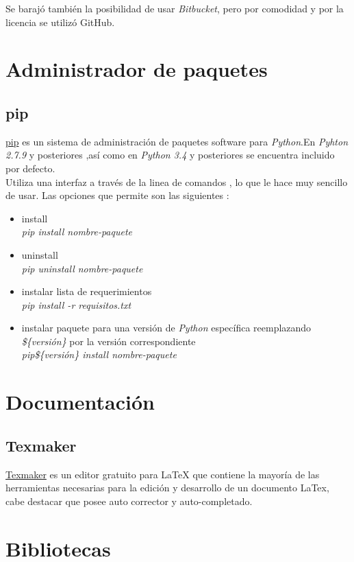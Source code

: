 Se barajó también la posibilidad de usar \emph{Bitbucket}, pero por comodidad y por la licencia se utilizó GitHub.
\section{Administrador de paquetes}
\subsection{pip} \label{pip}
\href{https://pypi.org/project/pip/}{pip} es un sistema de administración de paquetes software para \emph{Python}.En \emph{Pyhton 2.7.9} y posteriores ,así como en \emph{Python 3.4} y posteriores se encuentra incluido por defecto.\cite{pip}\\
Utiliza una interfaz a través de la linea de comandos , lo que le hace muy sencillo de usar. Las opciones que permite son las siguientes :
\begin{itemize}
	\item install \\
	\emph{pip install nombre-paquete}
	\item uninstall \\
	\emph{pip uninstall nombre-paquete}
	\item instalar lista de requerimientos\\
	\emph{pip install -r requisitos.txt}
	\item instalar paquete para una versión de \emph{Python} específica reemplazando \emph{\$\{versión\}} por la versión correspondiente\\
	\emph{pip\$\{versión\} install nombre-paquete}	
\end{itemize}
\section{Documentación}
\subsection{Texmaker}

\href {https://es.wikipedia.org/wiki/Texmaker}{Texmaker} es un editor gratuito para LaTeX que contiene la mayoría de las herramientas necesarias para la edición y desarrollo de un documento LaTex, cabe destacar que posee auto corrector y auto-completado.\cite{texmaker}

\section{Bibliotecas}

